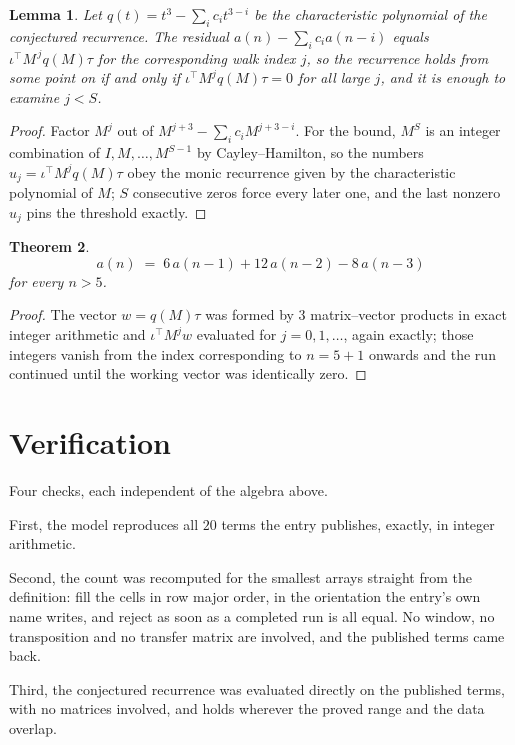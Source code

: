 \documentclass[11pt,a4paper]{article}
\theoremstyle{plain}
\newtheorem{theorem}{Theorem}
\newtheorem{lemma}[theorem]{Lemma}
\theoremstyle{definition}
\begin{document}
\begin{lemma}\label{lem:crit}
Let $q(t)=t^{3}-\sum_i c_it^{3-i}$ be the characteristic polynomial of the
conjectured recurrence. The residual $a(n)-\sum_ic_ia(n-i)$ equals
$\iota^{\!\top}M^{\,j}q(M)\tau$ for the corresponding walk index $j$, so the recurrence
holds from some point on if and only if $\iota^{\!\top}M^{j}q(M)\tau=0$ for all large $j$,
and it is enough to examine $j<S$.
\end{lemma}

\begin{proof}
Factor $M^{j}$ out of $M^{j+3}-\sum_ic_iM^{j+3-i}$. For the bound, $M^{S}$
is an integer combination of $I,M,\dots,M^{S-1}$ by Cayley--Hamilton, so the numbers
$u_j=\iota^{\!\top}M^{j}q(M)\tau$ obey the monic recurrence given by the characteristic
polynomial of $M$; $S$ consecutive zeros force every later one, and the last nonzero $u_j$
pins the threshold exactly.
\end{proof}

\begin{theorem}
\[
a(n)\;=\;6\,a(n-1) + 12\,a(n-2) - 8\,a(n-3)
\]
for every $n>5$.
\end{theorem}

\begin{proof}
The vector $w=q(M)\tau$ was formed by $3$ matrix--vector products in exact integer
arithmetic and $\iota^{\!\top}M^{j}w$ evaluated for $j=0,1,\dots$, again exactly; those
integers vanish from the index corresponding to $n=5+1$ onwards and the run continued
until the working vector was identically zero.
\end{proof}

\section{Verification}

Four checks, each independent of the algebra above.

First, the model reproduces all $20$ terms the entry publishes, exactly, in integer
arithmetic.

Second, the count was recomputed for the smallest arrays straight from the definition: fill the
cells in row major order, in the orientation the entry's own name writes, and reject as soon as
a completed run is all equal. No window, no transposition and no transfer matrix are involved, and
the published terms came back.

Third, the conjectured recurrence was evaluated directly on the published terms, with no
matrices involved, and holds wherever the proved range and the data overlap.
\end{document}

